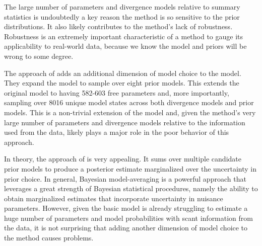 \documentclass[letterpaper,12pt]{article}
\begin{document}
\begin{linenumbers}
The large number of parameters and divergence models relative to 
summary statistics is undoubtedly a key reason the method is so sensitive
to the prior distributions.
It also likely contributes to the method's lack of robustness.
Robustness is an extremely important characteristic of a method to gauge its
applicability to real-world data, because we know the model and priors will be
wrong to some degree.

The approach of \citet{Hickerson2013} adds an additional dimension of model
choice to the model. They expand the model to sample over eight prior models.
This extends the original model to having 582-603 free parameters and, more
importantly, sampling over 8016 unique model states across both divergence
models and prior models.
This is a non-trivial extension of the model and, given the method's very large
number of parameters and divergence models relative to the information used
from the data, likely plays a major role in the poor behavior of this approach.

In theory, the approach of \citet{Hickerson2013} is very appealing.  It sums
over multiple candidate prior models to produce a posterior estimate
marginalized over the uncertainty in prior choice.
In general, Bayesian model-averaging is a powerful approach that leverages a
great strength of Bayesian statistical procedures, namely the ability to
obtain marginalized estimates that incorporate uncertainty in nuisance
parameters.
However, given the basic \msb model is already struggling to estimate
a huge number of parameters and model probabilities with scant information
from the data, it is not surprising that adding another dimension of
model choice to the method causes problems.


\end{linenumbers}
\end{document}
